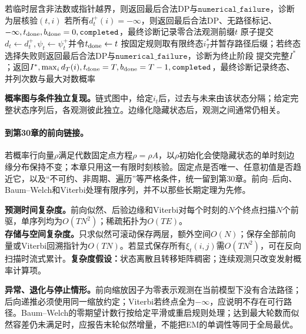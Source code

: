\begin{AlgorithmContract}
\begin{algorithm}[H]
{  若临时层含非法数或指针越界，则返回最后合法DP与$\mathtt{numerical\_failure}$，诊断为层核验$(t,i)$\;
  若所有$d_t^+(i)=-\infty$，则返回最后合法DP、无路径标记、$-\infty,t_{\rm done},b_{\rm done}=0,\mathtt{completed}$，最终诊断记录零合法观测前缀$t$\;
  原子提交$d_t\leftarrow d_t^+,\psi_t\leftarrow\psi_t^+$并令$t_{\rm done}\leftarrow t$\;
}
按固定规则取有限终态$i_T^*$并暂存路径后缀；若终态选择失败则返回最后合法DP与$\mathtt{numerical\_failure}$，诊断为终止阶段\;
提交完整$I^*$；返回$I^*,\max_i d_T(i),t_{\rm done}=T,b_{\rm done}=T-1,\mathtt{completed}$，最终诊断记录终态、并列次数与最大对数概率\;
\end{algorithm}
\end{AlgorithmContract}


\label{replay:V3-C05-S06-PRE-SQ-009}
\textbf{概率图与条件独立复现。}链式图中，给定$i_t$后，过去与未来由该状态分隔；给定完整状态序列后，各观测彼此独立。边缘化隐藏状态后，观测之间通常仍相关。

\paragraph{到第30章的前向链接。}若概率行向量$\rho$满足代数固定点方程$\rho=\rho A$，以$\rho$初始化会使隐藏状态的单时刻边缘分布保持不变；本章只用这一有限时刻核验。固定点是否唯一、任意初值是否趋近它，以及“不可约、非周期、遍历”等严格条件，统一留到第30章。前向--后向、Baum--Welch和Viterbi处理有限序列，并不以那些长期定理为先修。

\begin{complexitybox}
\textbf{预测时间复杂度。}前向似然、后验边缘和Viterbi对每个时刻的$N$个终点扫描$N$个前驱，单序列均为$O(TN^2)$；稀疏拓扑为$O(TE)$。\\
\textbf{存储与空间复杂度。}只求似然可滚动保存两层，额外空间$O(N)$；保存全部前向量或Viterbi回溯指针为$O(TN)$。若显式保存所有$\xi_t(i,j)$需$O(TN^2)$，可在反向扫描时流式累计。\textbf{复杂度假设：}状态离散且转移矩阵稠密；连续观测只改变发射概率计算项。

\textbf{异常、退化与停止情形。}前向缩放因子为零表示观测在当前模型下没有合法路径；后向递推必须使用同一缩放约定；Viterbi若终点全为$-\infty$，应说明不存在可行路径。Baum--Welch的零期望计数行按给定平滑或重启规则处理；达到最大轮数而似然容差仍未满足时，应报告末轮似然增量，不能把EM的单调性等同于全局最优。
\end{complexitybox}

